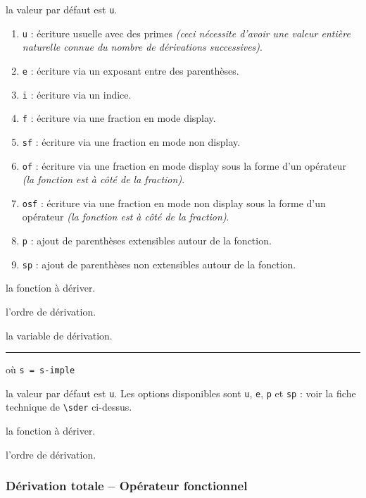 \documentclass[12pt,a4paper]{article}
\newcommand\env[1]{\texttt{#1}}
\newcommand\macro[1]{\env{\textbackslash{}#1}}
\theoremstyle{definition}
\newcommand\separation{
	\medskip
	\hfill\rule{0.5\textwidth}{0.75pt}\hfill
	\medskip
}
\newcommand\mwhyprefix[2]{%
	\texttt{#1 = #1-#2}%
}
\begin{document}
\IDoption{} la valeur par défaut est \verb+u+. 
\begin{enumerate}
	\item \verb+u+ : écriture usuelle avec des primes \emph{(ceci nécessite d'avoir une valeur entière naturelle connue du nombre de dérivations successives)}.

	\item \verb+e+ : écriture via un exposant entre des parenthèses.
	
	\item \verb+i+ : écriture via un indice.

	\item \verb+f+ : écriture via une fraction en mode display.

	\item \verb+sf+ : écriture via une fraction en mode non display.

	\item \verb+of+ : écriture via une fraction en mode display sous la forme d'un opérateur \emph{(la fonction est à côté de la fraction)}.

	\item \verb+osf+ : écriture via une fraction en mode non display sous la forme d'un opérateur \emph{(la fonction est à côté de la fraction)}.

	\smallskip
	\item \verb+p+ : ajout de parenthèses extensibles autour de la fonction.

	\item \verb+sp+ : ajout de parenthèses non extensibles autour de la fonction.
\end{enumerate}


 la fonction à dériver.

 l'ordre de dérivation.

 la variable de dérivation.


\separation


 où \quad \mwhyprefix{s}{imple}

\IDoption{} la valeur par défaut est \verb+u+. Les options disponibles sont \verb+u+, \verb+e+, \verb+p+ et \verb+sp+ : voir la fiche technique de \macro{sder} ci-dessus.

 la fonction à dériver.

 l'ordre de dérivation.




\subsubsection{Dérivation totale -- Opérateur fonctionnel}
\end{document}
